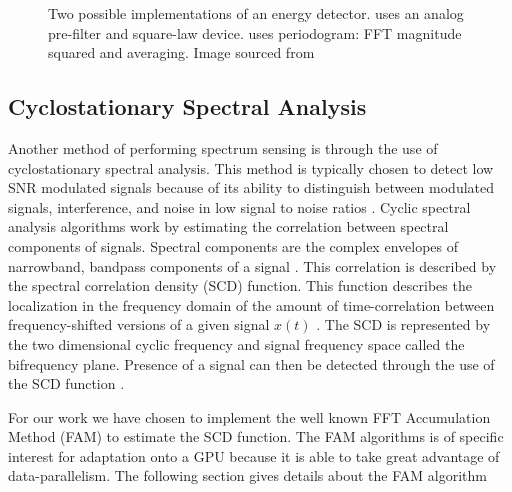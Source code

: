 \begin{figure} [ht]
\centering
\caption{Two possible implementations of an energy detector.   uses an analog pre-filter and square-law device.   uses periodogram: FFT magnitude squared and averaging. Image sourced from \cite{CabTkaBro06}}
\label{fig:energy_detect}
\end{figure}

\subsection{Cyclostationary Spectral Analysis}
\label{sect:cyclo}
Another method of performing spectrum sensing is through the use of cyclostationary spectral analysis.  This method is typically chosen to detect low SNR modulated signals because of its ability to distinguish between modulated signals, interference, and noise in low signal to noise ratios \cite{FenChenWan08}.  Cyclic spectral analysis algorithms work by estimating the correlation between spectral components of signals.  Spectral components are the complex envelopes of narrowband, bandpass components of a signal \cite{RobBroLoo91}.  This correlation is described by the spectral correlation density (SCD) function.  This function describes the localization in the frequency domain of the amount of time-correlation between frequency-shifted versions of a given signal $x(t)$ \cite{Costa96}.  The SCD is represented by the two dimensional cyclic frequency and signal frequency space \cite{FenChenWan08} called the bifrequency plane.  Presence of a signal can then be detected through the use of the SCD function \cite{Costa96}.

For our work we have chosen to implement the well known FFT Accumulation Method (FAM) to estimate the SCD function.  The FAM algorithms is of specific interest for adaptation onto a GPU because it is able to take great advantage of data-parallelism.  The following section gives details about the FAM algorithm

